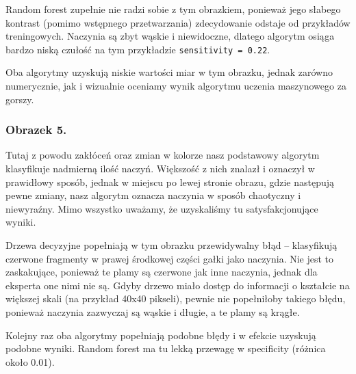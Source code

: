 \documentclass[11pt]{article}
\def\code#1{\texttt{#1}}
\begin{document}
Random forest zupełnie nie radzi sobie z tym obrazkiem, ponieważ jego słabego kontrast (pomimo wstępnego przetwarzania) zdecydowanie odstaje od przykładów treningowych. Naczynia są zbyt wąskie i niewidoczne, dlatego algorytm osiąga bardzo niską czułość na tym przykładzie \code{sensitivity = 0.22}.

Oba algorytmy uzyskują niskie wartości miar w tym obrazku, jednak zarówno numerycznie, jak i wizualnie oceniamy wynik algorytmu uczenia maszynowego za gorszy.

\subsubsection{Obrazek 5.}
Tutaj z powodu zakłóceń oraz zmian w kolorze nasz podstawowy algorytm klasyfikuje nadmierną ilość naczyń. Większość z nich znalazł i oznaczył w prawidłowy sposób, jednak w miejscu po lewej stronie obrazu, gdzie następują pewne zmiany, nasz algorytm oznacza naczynia w sposób chaotyczny i niewyraźny. Mimo wszystko uważamy, że uzyskaliśmy tu satysfakcjonujące wyniki.

Drzewa decyzyjne popełniają w tym obrazku przewidywalny błąd -- klasyfikują czerwone fragmenty w prawej środkowej części gałki jako naczynia. Nie jest to zaskakujące, ponieważ te plamy są czerwone jak inne naczynia, jednak dla eksperta one nimi nie są. Gdyby drzewo miało dostęp do informacji o kształcie na większej skali (na przykład 40x40 pikseli), pewnie nie popełniłoby takiego błędu, ponieważ naczynia zazwyczaj są wąskie i długie, a te plamy są krągłe.

Kolejny raz oba algorytmy popełniają podobne błędy i w efekcie uzyskują podobne wyniki. Random forest ma tu lekką przewagę w specificity (różnica około 0.01).
\end{document}
